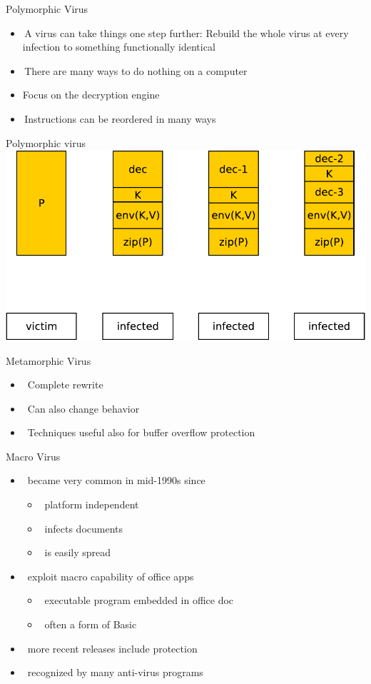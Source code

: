 \documentclass{beamer}
\begin{document}
\begin{frame}{Polymorphic Virus }
  \begin{itemize}
  \item A virus can take things one step further: 
    Rebuild the whole virus at every infection to 
    something functionally identical 
  \item There are many ways to do nothing on a 
    computer 
  \item Focus on the decryption engine
  \item Instructions can be reordered in many ways 
  \end{itemize}
\end{frame}

\begin{frame}{Polymorphic virus}
\includegraphics[width=0.8\linewidth]{poly}
\end{frame}

\begin{frame}{Metamorphic Virus}
  \begin{itemize}
  \item  Complete rewrite 
  \item  Can also change behavior
  \item  Techniques useful also for buffer overflow protection
  \end{itemize}
\end{frame}
 
\begin{frame}{Macro Virus }
  \begin{itemize}
  \item  became very common in mid-1990s since 
    \begin{itemize}
    \item  platform independent 
    \item  infects documents 
    \item  is easily spread 
    \end{itemize}
  \item  exploit macro capability of office apps 
    \begin{itemize}
    \item  executable program embedded in office doc 
    \item  often a form of Basic 
    \end{itemize}
  \item  more recent releases include protection 
  \item  recognized by many anti-virus programs 
  \end{itemize}
\end{frame}
\end{document}
